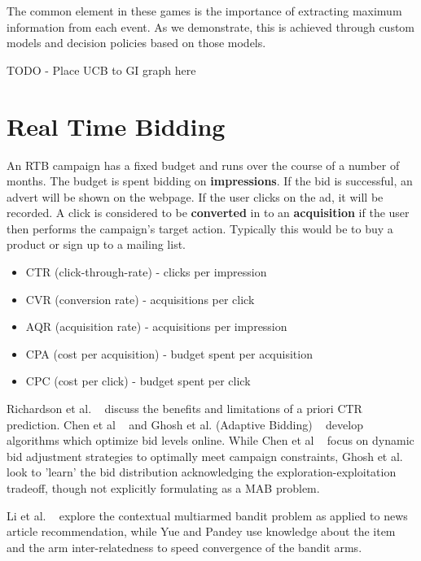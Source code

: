 \documentclass[11pt,a4,singlespacing,titlepagenumber=on]{scrreprt}
\numberwithin{equation}{chapter} %
\theoremstyle{remark}
\begin{document}
The common element in these games is the importance of extracting maximum information from each event. As we demonstrate, this is achieved through custom models and decision policies based on those models.


TODO - Place UCB to GI graph here




\section{Real Time Bidding}

An RTB campaign has a fixed budget and runs over the course of a number of months. The budget is spent bidding on \textbf{impressions}. If the bid is successful, an advert will be shown on the webpage. If the user clicks on the ad, it will be recorded. A click is considered to be \textbf{converted} in to an \textbf{acquisition} if the user then performs the campaign's target action. Typically this would be to buy a product or sign up to a mailing list.

\begin{itemize}
	\item CTR (click-through-rate) - clicks per impression
	\item CVR (conversion rate) - acquisitions per click 
	\item AQR (acquisition rate) - acquisitions per impression
	\item CPA (cost per acquisition) - budget spent per acquisition
	\item CPC (cost per click) - budget spent per click
\end{itemize}

Richardson et al. ~\cite{Richardson:2007:PCE:1242572.1242643} discuss the benefits and limitations of a priori CTR prediction. Chen et al ~\cite{Chen:2011:RBA:2020408.2020604} and Ghosh et al. (Adaptive Bidding) ~\cite{Ghosh:2009:ABD:1526709.1526744} develop algorithms which optimize bid levels online. While Chen et al ~\cite{Chen:2011:RBA:2020408.2020604} focus on dynamic bid adjustment strategies to optimally meet campaign constraints, Ghosh et al. ~\cite{raey} look to 'learn' the bid distribution acknowledging the exploration-exploitation tradeoff, though not explicitly formulating as a MAB problem.

Li et al. ~\cite{Li:2010:CAP:1772690.1772758} explore the contextual multiarmed bandit problem as applied to news article recommendation, while Yue and Pandey use knowledge about the item and the arm inter-relatedness to speed convergence of the bandit arms.
\end{document}
